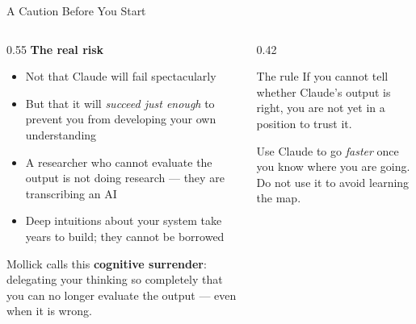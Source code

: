 \documentclass[aspectratio=169, 10pt]{beamer}
\begin{document}
\begin{frame}{A Caution Before You Start}
  \begin{columns}[T]
    \begin{column}{0.55\textwidth}
      \textbf{\color{biokteal}The real risk}
      \begin{itemize}[label=\textbullet]\setlength\itemsep{5pt}
        \item Not that Claude will fail spectacularly
        \item But that it will \emph{succeed just enough} to prevent you from developing your own understanding
        \item A researcher who cannot evaluate the output is not doing research --- they are transcribing an AI
        \item Deep intuitions about your system take years to build; they cannot be borrowed
      \end{itemize}
      \vspace{0.4em}
      {\small Mollick calls this \alert{\textbf{cognitive surrender}}: delegating your thinking so completely that you can no longer evaluate the output --- even when it is wrong.}
    \end{column}
    \begin{column}{0.42\textwidth}
      \begin{alertblock}{The rule}
        \small If you cannot tell whether Claude's output is right, you are not yet in a position to trust it.
      \end{alertblock}
      \vspace{0.7em}
      \begin{block}{}
        \small Use Claude to go \emph{faster} once you know where you are going.\\[0.4em]
        Do not use it to avoid learning the map.
      \end{block}
    \end{column}
  \end{columns}
\end{frame}
\end{document}
